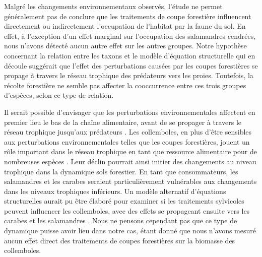  
Malgré les changements environnementaux observés, l'étude ne permet généralement pas de conclure que les traitements de coupe forestière influencent directement ou indirectement l’occupation de l’habitat par la faune du sol. 
En effet, à l’exception d’un effet marginal sur l’occupation des salamandres cendrées, nous n’avons détecté aucun autre effet sur les autres groupes. 
Notre hypothèse concernant la relation entre les taxons et le modèle d'équation structurelle qui en découle suggérait que l'effet des perturbations causées par les coupes forestières se propage à travers le réseau trophique des prédateurs vers les proies. 
Toutefois, la récolte forestière ne semble pas affecter la cooccurrence entre ces trois groupes d'espèces, selon ce type de relation. 

Il serait possible d'envisager que les perturbations environnementales affectent en premier lieu le bas de la chaîne alimentaire, avant de se propager à travers le réseau trophique jusqu'aux prédateurs \citep{Chauvat2014Responsesoil,Laigle2021Directindirect}. 
Les collemboles, en plus d'être sensibles aux perturbations environnementales telles que les coupes forestières, jouent un rôle important dans le réseau trophique en tant que ressource alimentaire pour de nombreuses espèces \citep{Burton1975Energyflow,Bauer1982Predationcarabid,rusekBiodiversityCollembolaTheir1998,Chauvat2014Responsesoil}. 
Leur déclin pourrait ainsi initier des changements au niveau trophique dans la dynamique sols forestier.
En tant que consommateurs, les salamandres et les carabes seraient particulièrement vulnérables aux changements dans les niveaux trophiques inférieurs. 
Un modèle alternatif d'équations structurelles aurait pu être élaboré pour examiner si les traitements sylvicoles peuvent influencer les collemboles, avec des effets se propageant ensuite vers les carabes et les salamandres \citep{Laigle2021Directindirect}. 
Nous ne pensons cependant pas que ce type de dynamique puisse avoir lieu dans notre cas, étant donné que nous n'avons mesuré aucun effet direct des traitements de coupes forestières sur la biomasse des collemboles. 


